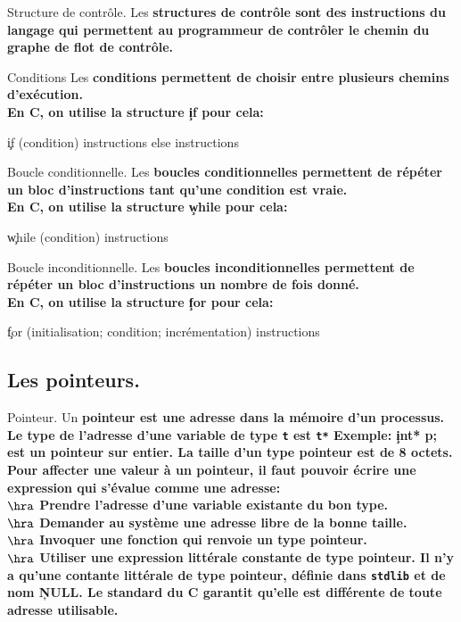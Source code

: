 \documentclass[french, 11pt]{article}
\begin{document}
\begin{defi}{Structure de contrôle.}{}
    Les \bf{structures de contrôle} sont des instructions du langage qui permettent au programmeur de contrôler le chemin du graphe de flot de contrôle.
\end{defi}

\begin{defi}{Conditions}{}
    Les \bf{conditions} permettent de choisir entre plusieurs chemins d'exécution.\\
    En C, on utilise la structure \c{if} pour cela:
    \begin{center}
        \c{if (condition) { instructions } else { instructions }}
    \end{center}
\end{defi}

\begin{defi}{Boucle conditionnelle.}{}
    Les \bf{boucles conditionnelles} permettent de répéter un bloc d'instructions tant qu'une condition est vraie.\\
    En C, on utilise la structure \c{while} pour cela:
    \begin{center}
        \c{while (condition) { instructions }}
    \end{center}
\end{defi}

\begin{defi}{Boucle inconditionnelle.}{}
    Les \bf{boucles inconditionnelles} permettent de répéter un bloc d'instructions un nombre de fois donné.\\
    En C, on utilise la structure \c{for} pour cela:
    \begin{center}
        \c{for (initialisation; condition; incrémentation) { instructions }}
    \end{center}
\end{defi}

\subsection{Les pointeurs.}

\begin{defi}{Pointeur.}{}
    Un \bf{pointeur} est une adresse dans la mémoire d'un processus.\\
    Le type de l'adresse d'une variable de type \texttt{t} est \texttt{t*}\n
    \bf{Exemple:} \c{int* p;} est un pointeur sur entier.\n
    La taille d'un type pointeur est de 8 octets. Pour affecter une valeur à un pointeur, il faut pouvoir écrire une expression qui s'évalue comme une adresse:\\
    $\hra$ Prendre l'adresse d'une variable existante du bon type.\\
    $\hra$ Demander au système une adresse libre de la bonne taille.\\
    $\hra$ Invoquer une fonction qui renvoie un type pointeur.\\
    $\hra$ Utiliser une expression littérale constante de type pointeur.\n
    Il n'y a qu'une contante littérale de type pointeur, définie dans \texttt{stdlib} et de nom \c{NULL}. Le standard du C garantit qu'elle est différente de toute adresse utilisable.
\end{defi}
\end{document}
